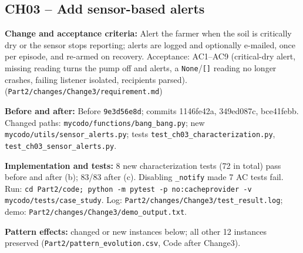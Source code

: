 \documentclass[11pt,a4paper]{article}
\newcommand{\field}[2]{\textbf{#1:} #2\par}
\begin{document}
\subsection*{CH03 -- Add sensor-based alerts}
\field{Change and acceptance criteria}{Alert the farmer when the soil is critically dry or the sensor stops reporting; alerts are logged and optionally e-mailed, once per episode, and re-armed on recovery. Acceptance: AC1--AC9 (critical-dry alert, missing reading turns the pump off and alerts, a \texttt{None}/\texttt{[]} reading no longer crashes, failing listener isolated, recipients parsed). (\texttt{Part2/\allowbreak{}changes/\allowbreak{}Change3/\allowbreak{}requirement.\allowbreak{}md})}
\field{Before and after}{Before \texttt{9e3d56e8d}; commits 1146fe42a, 349ed087c, bce41febb. Changed paths: \texttt{mycodo/\allowbreak{}functions/\allowbreak{}bang\_\allowbreak{}bang.\allowbreak{}py}; new \texttt{mycodo/\allowbreak{}utils/\allowbreak{}sensor\_\allowbreak{}alerts.\allowbreak{}py}; tests \texttt{test\_\allowbreak{}ch03\_\allowbreak{}characterization.\allowbreak{}py}, \texttt{test\_\allowbreak{}ch03\_\allowbreak{}sensor\_\allowbreak{}alerts.\allowbreak{}py}.}
\field{Implementation and tests}{8 new characterization tests (72 in total) pass before and after (b); 83/83 after (c). Disabling \texttt{\_\allowbreak{}notify} made 7 AC tests fail. Run: \texttt{cd Part2/\allowbreak{}code; python -m pytest -p no:cacheprovider -v mycodo/\allowbreak{}tests/\allowbreak{}case\_\allowbreak{}study}. Log: \texttt{Part2/\allowbreak{}changes/\allowbreak{}Change3/\allowbreak{}test\_\allowbreak{}result.\allowbreak{}log}; demo: \texttt{Part2/\allowbreak{}changes/\allowbreak{}Change3/\allowbreak{}demo\_\allowbreak{}output.\allowbreak{}txt}.}
\field{Pattern effects}{changed or new instances below; all other 12 instances preserved (\texttt{Part2/\allowbreak{}pattern\_\allowbreak{}evolution.\allowbreak{}csv}, Code after Change3).}
\end{document}
